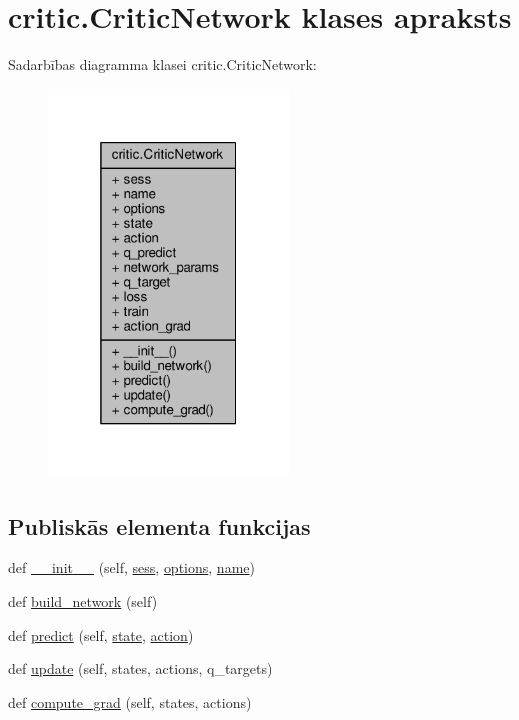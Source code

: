\hypertarget{classcritic_1_1_critic_network}{}\section{critic.\+Critic\+Network klases apraksts}
\label{classcritic_1_1_critic_network}


Sadarbības diagramma klasei critic.\+Critic\+Network\+:
\nopagebreak
\begin{figure}[H]
\begin{center}
\leavevmode
\includegraphics[width=181pt]{classcritic_1_1_critic_network__coll__graph}
\end{center}
\end{figure}
\subsection*{Publiskās elementa funkcijas}
\begin{DoxyCompactItemize}
\item 
def \hyperlink{classcritic_1_1_critic_network_a7f619dd822278ac236b4398003c06f94}{\+\_\+\+\_\+init\+\_\+\+\_\+} (self, \hyperlink{classcritic_1_1_critic_network_ad19c4eb9fce11599a0807f94fcab6343}{sess}, \hyperlink{classcritic_1_1_critic_network_a14fa3b43d18dc2e8e5ca3fcd617b8bcc}{options}, \hyperlink{classcritic_1_1_critic_network_ad7a59dc914d7e6eff3d96c6c819bef38}{name})
\item 
def \hyperlink{classcritic_1_1_critic_network_a6ef997aa35d20b9ff53caa8c87fea17a}{build\+\_\+network} (self)
\item 
def \hyperlink{classcritic_1_1_critic_network_a52b79a3c802070dc8925733bf7dcb42e}{predict} (self, \hyperlink{classcritic_1_1_critic_network_a21da613cb1688ada3b416e4286649fc2}{state}, \hyperlink{classcritic_1_1_critic_network_a78b46c2dc517101434ffc7053581f5a6}{action})
\item 
def \hyperlink{classcritic_1_1_critic_network_af383ed0494f00bb145040d6acdbc6913}{update} (self, states, actions, q\+\_\+targets)
\item 
def \hyperlink{classcritic_1_1_critic_network_aca9bfaf828183ad50b80e971e4de446c}{compute\+\_\+grad} (self, states, actions)
\end{DoxyCompactItemize}
